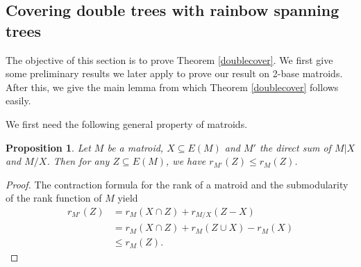 \documentclass{article}
\newtheorem{Proposition}[Statement]{Proposition}
\newtheorem{Theorem}[Statement]{Theorem}
\newtheorem{Corollary}[Statement]{Corollary}
\begin{document}






\subsection{Covering double trees with rainbow spanning trees}\label{k2}

The objective of this section is to prove Theorem \ref{doublecover}. We first give some preliminary results we later apply to prove our result on 2-base matroids. After this, we give the main lemma from which Theorem \ref{doublecover} follows easily.

We first need the following general property of matroids.

\begin{Proposition}\label{contract}
Let $M$ be a matroid, $X \subseteq E(M)$ and $M'$ the direct sum of $M|X$ and $M/X$. Then for any $Z \subseteq E(M)$, we have $r_{M'}(Z)\leq r_M(Z)$.
\end{Proposition}
\begin{proof}
The contraction formula for the rank of a matroid and the submodularity of the rank function of $M$ yield \begin{align*}r_{M'}(Z)&=r_M(X \cap Z)+r_{M/X}(Z-X)\\&=r_M(X \cap Z)+r_M(Z \cup X)-r_M(X)\\&\leq r_M(Z).\end{align*}
\end{proof}
\end{document}
